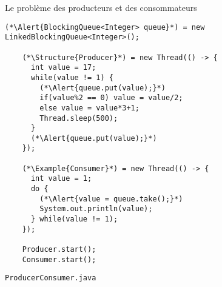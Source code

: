 
\begingroup

\begin{frame}[fragile]{Le problème des producteurs et des consommateurs}

  \begin{lstlisting}[gobble=4]
    (*\Alert{BlockingQueue<Integer> queue}*) = new LinkedBlockingQueue<Integer>();

    (*\Structure{Producer}*) = new Thread(() -> {
      int value = 17;
      while(value != 1) {
        (*\Alert{queue.put(value);}*)
        if(value%2 == 0) value = value/2;
        else value = value*3+1;
        Thread.sleep(500);
      }
      (*\Alert{queue.put(value);}*)
    });

    (*\Example{Consumer}*) = new Thread(() -> {
      int value = 1;
      do {
        (*\Alert{value = queue.take();}*)
        System.out.println(value);
      } while(value != 1);
    });

    Producer.start();
    Consumer.start();
  \end{lstlisting}

  \begin{citing}
    \jitem \lstinline{ProducerConsumer.java}
  \end{citing}
\end{frame}

\endgroup
\endinput
